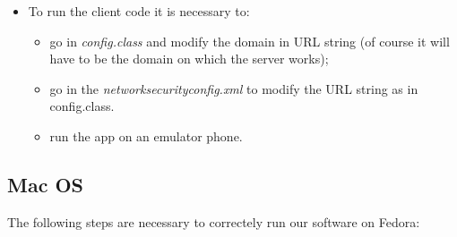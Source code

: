\begin{itemize}
	
	\item To run the client code it is necessary to:
		\begin{itemize}
			\item go in \textit{config.class} and modify the domain in URL string (of course it will have to be the domain on 					which the server works);
			\item go in the  \textit{networksecurityconfig.xml}  to modify the URL string as in config.class.
			\item run the app on an emulator phone.
		\end{itemize} 
\end{itemize}

\subsection{Mac OS}
The following steps are necessary to correctely run our software on Fedora:
